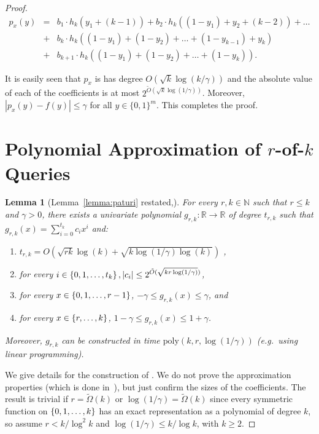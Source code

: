\documentclass[11pt]{article}
\newcommand\N{\mathbb{N}}
\newcommand\R{\mathbb{R}}
\newcommand\poly{\mathrm{poly}}
\newcommand\from{\colon}
\newtheorem{lemma}[theorem]{Lemma}
\theoremstyle{definition}
\begin{document}
\begin{proof}
\[\begin{array}{lll}
p_x(y) & = & b_1 \cdot h_k\left(y_1 + (k-1)\right) + b_2 \cdot h_k\left((1-y_1)+y_2 + (k-2)\right) + \dots  \\
& + & b_k \cdot h_k\left((1-y_1) + (1-y_2) + \dots + (1-y_{k-1}) + y_k\right) \\
  & + & b_{k+1} \cdot h_k\left((1-y_1) + (1-y_2) + \dots + (1-y_k)\right).\end{array}\]

It is easily seen that $p_x$ is has degree $O(\sqrt{k} \log(k/\gamma))$ and the absolute value of each of the coefficients is at most $2^{\tilde{O}(\sqrt{k} \log(1/\gamma))}$. Moreover, $|p_x(y) - f(y)| \leq \gamma$ for all $y \in \{0, 1\}^m$. This completes the proof.

\section{Polynomial Approximation of $r$-of-$k$ Queries}
\label{sherstovapp}
\begin{lemma}[Lemma~\ref{lemma:paturi} restated,\cite{Sherstov09}]
For every $r,k \in \N$ such that $r \leq k$ and $\gamma > 0$, there exists a univariate polynomial $g_{r,k}\from \R \to \R$ of degree $t_{r,k}$ such that $g_{r,k}(x) = \sum_{i=0}^{t_k} c_i x^i$ and:
\begin{enumerate}
\item $t_{r,k} = O\left(\sqrt{rk} \log(k) + \sqrt{k \log(1/\gamma)\log(k)}\right)$ ,
\item for every $i \in \left\{0,1,\dots, t_k\right\}, |c_i| \leq  2^{\tilde{O}(\sqrt{kr \log(1/\gamma)})}$,
\item for every $x \in \left\{0,1,\dots,r-1\right\}$, $-\gamma \leq g_{r,k}(x) \leq \gamma$, and
\item for every $x \in \left\{r, \dots, k\right\}$, $1-\gamma \leq g_{r,k}(x) \leq 1+\gamma$.
\end{enumerate}
Moreover, $g_{r,k}$ can be constructed in time $\poly(k, r, \log(1/\gamma))$ (e.g.~using linear programming).
\end{lemma}
We give details for the construction of \cite[Lemma 3.11]{Sherstov09}. We do not prove the approximation properties (which is done in~\cite{Sherstov09}), but just confirm the sizes of the coefficients.  
The result is trivial if $r=\tilde{\Omega}(k)$ or $\log(1 / \gamma) = \tilde{\Omega}(k)$ since every symmetric function on $\left\{0,1,\dots,k\right\}$
has an exact representation as a polynomial of degree $k$, so assume $r < k / \log^2 k$ and $\log(1/\gamma) \leq k / \log k$, with $k \geq 2$. 




\end{proof}
\end{document}
